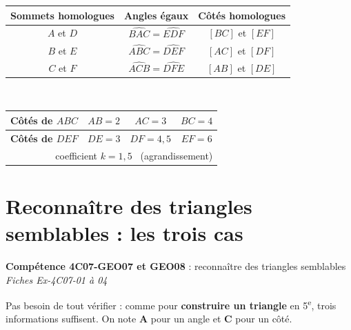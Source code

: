 \documentclass[11pt]{article}
\newcommand{\comp}[2]{\par\smallskip\noindent\colorbox{gray!15}{\parbox{\dimexpr\linewidth-2\fboxsep}{\small\textbf{Compétence #1} : #2}}\par\smallskip}
\begin{document}
\begin{center}
\renewcommand{\arraystretch}{1.35}
\begin{tabular}{|c|c|c|}
\hline
\textbf{Sommets homologues} & \textbf{Angles égaux} & \textbf{Côtés homologues} \\ \hline
$A$ et $D$ & $\widehat{BAC} = \widehat{EDF}$ & $[BC]$ et $[EF]$ \\ \hline
$B$ et $E$ & $\widehat{ABC} = \widehat{DEF}$ & $[AC]$ et $[DF]$ \\ \hline
$C$ et $F$ & $\widehat{ACB} = \widehat{DFE}$ & $[AB]$ et $[DE]$ \\ \hline
\end{tabular}\\[3mm]
\begin{tabular}{|l|c|c|c|}
\hline
\textbf{Côtés de $ABC$} & $AB = 2$ & $AC = 3$ & $BC = 4$ \\ \hline
\textbf{Côtés de $DEF$} & $DE = 3$ & $DF = 4,5$ & $EF = 6$ \\ \hline
\multicolumn{4}{r}{coefficient $k = 1,5$ \ (agrandissement)}
\end{tabular}
\end{center}

\section{Reconnaître des triangles semblables : les trois cas}
\comp{4C07-GEO07 et GEO08}{reconnaître des triangles semblables \hfill \textit{Fiches Ex-4C07-01 à 04}}

Pas besoin de tout vérifier : comme pour \textbf{construire un triangle} en 5\textsuperscript{e}, trois informations suffisent.
On note \textbf{A} pour un angle et \textbf{C} pour un côté.
\end{document}
